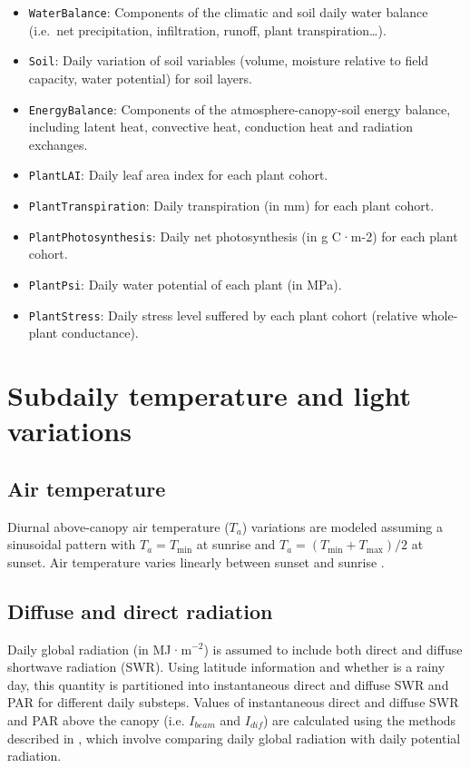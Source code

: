 \documentclass[]{book}
\providecommand{\tightlist}{%
  \setlength{\itemsep}{0pt}\setlength{\parskip}{0pt}}
\begin{document}
\begin{itemize}
\tightlist
\item
  \texttt{WaterBalance}: Components of the climatic and soil daily water
  balance (i.e.~net precipitation, infiltration, runoff, plant
  transpiration\ldots{}).
\item
  \texttt{Soil}: Daily variation of soil variables (volume, moisture
  relative to field capacity, water potential) for soil layers.
\item
  \texttt{EnergyBalance}: Components of the atmosphere-canopy-soil
  energy balance, including latent heat, convective heat, conduction
  heat and radiation exchanges.
\item
  \texttt{PlantLAI}: Daily leaf area index for each plant cohort.
\item
  \texttt{PlantTranspiration}: Daily transpiration (in mm) for each
  plant cohort.
\item
  \texttt{PlantPhotosynthesis}: Daily net photosynthesis (in g C·m-2)
  for each plant cohort.
\item
  \texttt{PlantPsi}: Daily water potential of each plant (in MPa).
\item
  \texttt{PlantStress}: Daily stress level suffered by each plant cohort
  (relative whole-plant conductance).
\end{itemize}

\chapter{Subdaily temperature and light
variations}\label{subdaily-temperature-and-light-variations}

\section{Air temperature}\label{air-temperature}

Diurnal above-canopy air temperature (\(T_a\)) variations are modeled
assuming a sinusoidal pattern with \(T_a = T_{\min}\) at sunrise and
\(T_a = (T_{\min}+T_{\max})/2\) at sunset. Air temperature varies
linearly between sunset and sunrise \citep{McMurtrie1990}.

\section{Diffuse and direct
radiation}\label{diffuse-and-direct-radiation}

Daily global radiation (in MJ·m\(^{-2}\)) is assumed to include both
direct and diffuse shortwave radiation (SWR). Using latitude information
and whether is a rainy day, this quantity is partitioned into
instantaneous direct and diffuse SWR and PAR for different daily
substeps. Values of instantaneous direct and diffuse SWR and PAR above
the canopy (i.e. \(I_{beam}\) and \(I_{dif}\)) are calculated using the
methods described in \citet{Spitters1986}, which involve comparing daily
global radiation with daily potential radiation.
\end{document}
